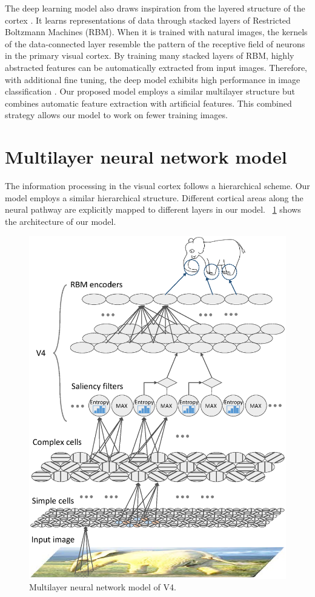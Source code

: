 \documentclass[twocolumn]{article}
\begin{document}
The deep learning model also draws inspiration from the layered structure of the cortex \cite{bengio2009}.
It learns representations of data through stacked layers of Restricted Boltzmann Machines (RBM).
When it is trained with natural images, 
the kernels of the data-connected layer resemble the pattern of the receptive field of neurons in the primary visual cortex.
By training many stacked layers of RBM, highly abstracted features can be automatically extracted from input images.
Therefore, with additional fine tuning, the deep model exhibits high performance in image classification \cite{krizhevsky2012}.
Our proposed model employs a similar multilayer structure but combines automatic feature extraction with artificial features.
This combined strategy allows our model to work on fewer training images.

\section{Multilayer neural network model}\label{sec:3}

The information processing in the visual cortex follows a hierarchical scheme.
Our model employs a similar hierarchical structure.
Different cortical areas along the neural pathway are explicitly mapped to different layers in our model. 
\figurename~\ref{fig:3} shows the architecture of our model.

\begin{figure}[!t]
\centerline{\includegraphics[width=\linewidth]{fig3.eps}} 
\caption{Multilayer neural network model of V4.}
\label{fig:3}
\end{figure}
\end{document}
